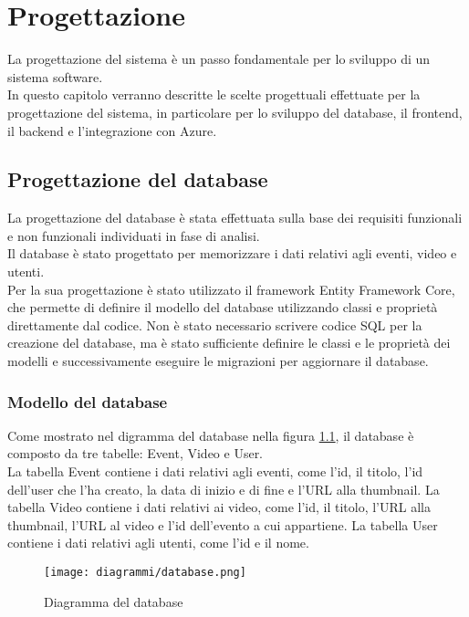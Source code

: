 \chapter{Progettazione}
\label{cap:progettazione}

La progettazione del sistema è un passo fondamentale per lo sviluppo di un sistema software.\\
In questo capitolo verranno descritte le scelte progettuali effettuate per la progettazione del sistema, in particolare per lo sviluppo del database, il frontend, il backend e l'integrazione con Azure.\\
\section{Progettazione del database}
La progettazione del database è stata effettuata sulla base dei requisiti funzionali e non funzionali individuati in fase di analisi.\\
Il database è stato progettato per memorizzare i dati relativi agli eventi, video e utenti.\\
Per la sua progettazione è stato utilizzato il framework Entity Framework Core, che permette di definire il modello del database utilizzando classi e proprietà direttamente dal codice. Non è stato necessario scrivere codice SQL per la creazione del database, ma è stato sufficiente definire le classi e le proprietà dei modelli e successivamente eseguire le migrazioni per aggiornare il database.\\
\pagebreak
\subsection{Modello del database}
Come mostrato nel digramma del database nella figura \ref{fig:schema database}, il database è composto da tre tabelle: Event, Video e User.\\
La tabella Event contiene i dati relativi agli eventi, come l'id, il titolo, l'id dell'user che l'ha creato, la data di inizio e di fine e l'URL alla thumbnail. La tabella Video contiene i dati relativi ai video, come l'id, il titolo, l'URL alla thumbnail, l'URL al video e l'id dell'evento a cui appartiene. La tabella User contiene i dati relativi agli utenti, come l'id e il nome.
\begin{figure}[H] 
    \centering 
    \texttt{[image: diagrammi/database.png]} 
    \caption{Diagramma del database}
    \label{fig:schema database}
\end{figure}

